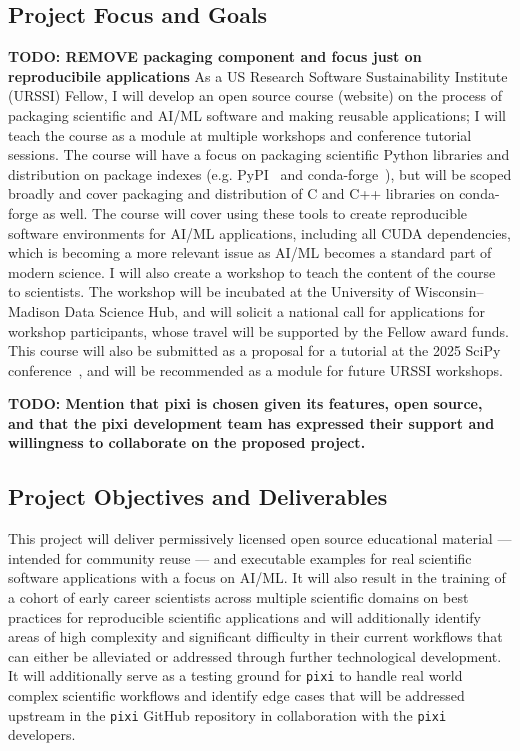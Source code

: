 \documentclass[letterpaper, 11pt]{article}
\newcommand{\fullinstitute}{University of Wisconsin--Madison}
\newcommand{\fullprogram}{US Research Software Sustainability Institute}
\newcommand{\program}{URSSI}
\begin{document}
\subsection{Project Focus and Goals}
\textbf{TODO: REMOVE packaging component and focus just on reproducibile applications}
As a \fullprogram{} (\program{}) Fellow, I will develop an open source course (website) on the process of packaging scientific and AI/ML software and making reusable applications; I will teach the course as a module at multiple workshops and conference tutorial sessions.
The course will have a focus on packaging scientific Python libraries and distribution on package indexes (e.g. PyPI~ and conda-forge~), but will be scoped broadly and cover packaging and distribution of C and C++ libraries on conda-forge as well.
The course will cover using these tools to create reproducible software environments for AI/ML applications, including all CUDA dependencies, which is becoming a more relevant issue as AI/ML becomes a standard part of modern science.
I will also create a workshop to teach the content of the course to scientists.
The workshop will be incubated at the \fullinstitute{} Data Science Hub, and will solicit a national call for applications for workshop participants, whose travel will be supported by the Fellow award funds.
This course will also be submitted as a proposal for a tutorial at the 2025 SciPy conference~, and will be recommended as a module for future URSSI workshops.

\textbf{TODO: Mention that pixi is chosen given its features, open source, and that the pixi development team has expressed their support and willingness to collaborate on the proposed project.}

\subsection{Project Objectives and Deliverables}
This project will deliver permissively licensed open source educational material --- intended for community reuse --- and executable examples for real scientific software applications with a focus on AI/ML.
It will also result in the training of a cohort of early career scientists across multiple scientific domains on best practices for reproducible scientific applications and will additionally identify areas of high complexity and significant difficulty in their current workflows that can either be alleviated or addressed through further technological development.
It will additionally serve as a testing ground for \texttt{pixi} to handle real world complex scientific workflows and identify edge cases that will be addressed upstream in the \texttt{pixi} GitHub repository in collaboration with the \texttt{pixi} developers.
\end{document}
